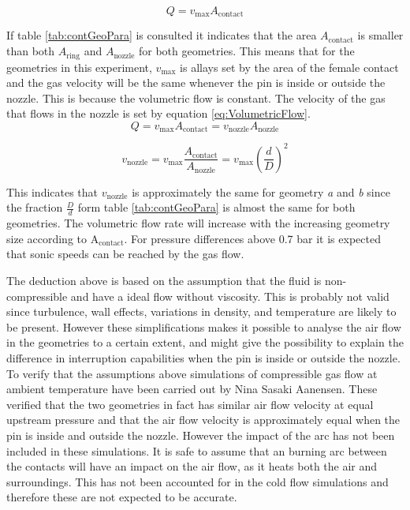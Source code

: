\documentclass[10pt,a4paper]{article}
\begin{document}
\begin{equation} \label{eq:flowRate}
Q=v_{\mathrm{max}} A_\mathrm{{contact}}
\end{equation} 

If table \ref{tab:contGeoPara} is consulted it indicates that the area $ A_\mathrm{{contact}}$ is smaller than both $A_\mathrm{{ring}}$ and $A_\mathrm{{nozzle}}$ for both geometries. This means that for the geometries in this experiment, $v_\mathrm{{max}}$ is allays set by the area of the female contact and the gas velocity will be the same whenever the pin is inside or outside the nozzle. This is because the volumetric flow is constant. The velocity of the gas that flows in the nozzle is set by equation \eqref{eq:VolumetricFlow}.
\begin{equation*}
Q=v_\mathrm{{max}} A_\mathrm{{contact}} = v_\mathrm{{nozzle}} A_\mathrm{{nozzle}}
\end{equation*}


\begin{equation} \label{eq:VolumetricFlow}
v_\mathrm{{nozzle}}= v_\mathrm{{max}}\frac{A_\mathrm{{contact}}}{A_\mathrm{{nozzle}} }= v_\mathrm{{max}} (\frac{d}{D})^2
\end{equation} 

This indicates that $v_\mathrm{{nozzle}}$ is approximately the same for geometry \textit{a} and \textit{b} since the fraction $\frac{D}{d}$ form table \ref{tab:contGeoPara} is almost the same for both geometries. The volumetric flow rate will increase with the increasing geometry size according to A$_\mathrm{{contact}}$. For pressure differences above 0.7 bar it is expected that sonic speeds can be reached by the gas flow.

The deduction above is based on the assumption that the fluid is non-compressible and have a ideal flow without viscosity. This is probably not valid since turbulence, wall effects, variations in density, and temperature are likely to be present. However these simplifications makes it possible to analyse the air flow in the geometries to a certain extent, and might give the possibility to explain the difference in interruption capabilities when the pin is inside or outside the nozzle. To verify that the assumptions above simulations of compressible gas flow at ambient temperature have been carried out by Nina Sasaki Aanensen. These verified that the two geometries in fact has similar air flow velocity at equal upstream pressure and that the air flow velocity is approximately equal when the pin is inside and outside the nozzle. However the impact of the arc has not been included in these simulations. It is safe to assume that an burning arc between the contacts will have an impact on the air flow, as it heats both the air and surroundings. This has not been accounted for in the cold flow simulations and therefore these are not expected to be accurate.
\end{document}
